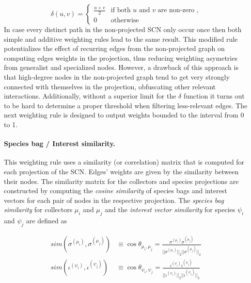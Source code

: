 $$\delta(u,v) = 
\begin{cases}
\frac{u+v}{2} &  \mbox{if both } u \mbox{ and } v \mbox{ are non-zero ,}\\
0 & \mbox{otherwise}
\end{cases}
$$
In case every distinct path in the non-projected SCN only occur once then both simple and additive weighting rules lead to the same result. 
This modified rule potentializes the effect of recurring edges from the non-projected graph on computing edges weights in the projection, thus reducing weighting asymetries from generalist and specialized nodes.
However, a drawback of this approach is that high-degree nodes in the non-projected graph tend to get very strongly connected with themselves in the projection, obfuscating other relevant interactions.
Additionally, without a superior limit for the $\delta$ function it turns out to be hard to determine a proper threshold when filtering less-relevant edges. The next weighting rule is designed to output weights bounded to the interval from 0 to 1.

\paragraph*{Species bag / Interest similarity.}
This weighting rule uses a similarity (or correlation) matrix that is computed for each projection of the SCN. Edges' weights are given by the similarity between their nodes. The similarity matrix for the collectors and species projections are constructed by computing the  \textit{cosine similarity} of species bags and interest vectors  for each pair of nodes in the respective projection. 
The \textit{species bag similarity} for collectors $\mu_i$ and $\mu_j$ and the \textit{interest vector similarity} for species $\psi_i$ and $\psi_j$ are defined as

\begin{equation}
\begin{split}
sim(\sigma^{(\mu_i)},\sigma^{(\mu_j)}) &\equiv
\cos \theta_{\mu_i,\mu_j} =
\frac{  \sigma^{(\mu_i)} \sigma^{(\mu_j)}  }{  ||\sigma^{(\mu_i)}||_2  ||\sigma^{(\mu_j)}||_2  } \\
sim(\iota^{(\psi_i)},\iota^{(\psi_j)}) &\equiv
\cos \theta_{\psi_i,\psi_j} =
\frac{  \iota^{(\psi_i)} \iota^{(\psi_j)}  }{  ||\iota^{(\psi_i)}||_2  ||\iota^{(\psi_j)}||_2  } 
\end{split}
\end{equation}


